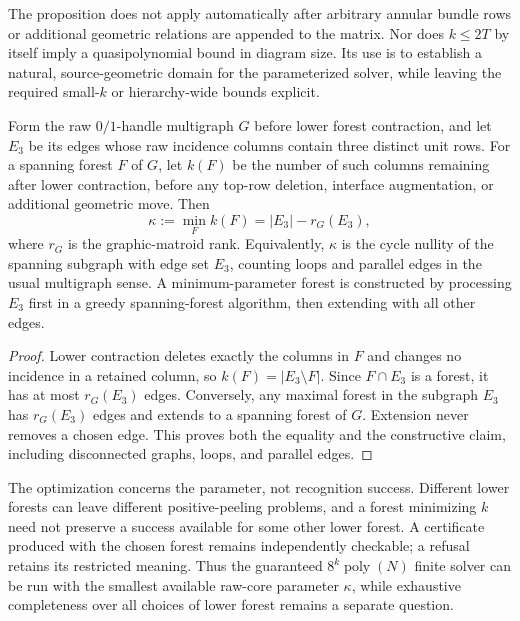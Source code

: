 The proposition does not apply automatically after arbitrary annular bundle
rows or additional geometric relations are appended to the matrix.  Nor does
$k\le 2T$ by itself imply a quasipolynomial bound in diagram size.  Its use is
to establish a natural, source-geometric domain for the parameterized solver,
while leaving the required small-$k$ or hierarchy-wide bounds explicit.

\begin{proposition}
\label{prop:optimal-lower-forest}
Form the raw $0/1$-handle multigraph $G$ before lower forest contraction, and
let $E_3$ be its edges whose raw incidence columns contain three distinct
unit rows.  For a spanning forest $F$ of $G$, let $k(F)$ be the number of
such columns remaining after lower contraction, before any top-row deletion,
interface augmentation, or additional geometric move.  Then
\[
 \kappa:=\min_F k(F)=|E_3|-r_G(E_3),
\]
where $r_G$ is the graphic-matroid rank.  Equivalently, $\kappa$ is the cycle
nullity of the spanning subgraph with edge set $E_3$, counting loops and
parallel edges in the usual multigraph sense.  A minimum-parameter forest
is constructed by processing $E_3$ first in a greedy spanning-forest
algorithm, then extending with all other edges.
\end{proposition}

\begin{proof}
Lower contraction deletes exactly the columns in $F$ and changes no
incidence in a retained column, so $k(F)=|E_3\setminus F|$.  Since
$F\cap E_3$ is a forest, it has at most $r_G(E_3)$ edges.  Conversely, any
maximal forest in the subgraph $E_3$ has $r_G(E_3)$ edges and extends to a
spanning forest of $G$.  Extension never removes a chosen edge.  This proves
both the equality and the constructive claim, including disconnected graphs,
loops, and parallel edges.
\end{proof}

The optimization concerns the parameter, not recognition success.  Different
lower forests can leave different positive-peeling problems, and a forest
minimizing $k$ need not preserve a success available for some other lower
forest.  A certificate produced with the chosen forest remains independently
checkable; a refusal retains its restricted meaning.  Thus the guaranteed
$8^k\operatorname{poly}(N)$ finite solver can be run with the smallest
available raw-core parameter $\kappa$, while exhaustive completeness over
all choices of lower forest remains a separate question.
